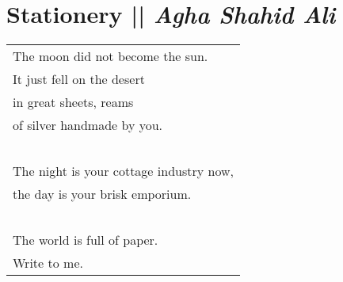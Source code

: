 \section[Stationery]{Stationery || \emph{Agha Shahid Ali} \hspace*{\fill}  \thepage}
\hspace{0pt}
\vfill
\begin{center}
\begin{tabular}{l}
The moon did not become the sun.\\
It just fell on the desert\\
in great sheets, reams\\
of silver handmade by you.\\

\-\ \\The night is your cottage industry now,\\
the day is your brisk emporium.\\

\-\ \\The world is full of paper.\\
Write to me.
\end{tabular}
\end{center}
\vfill
\hspace{0pt}